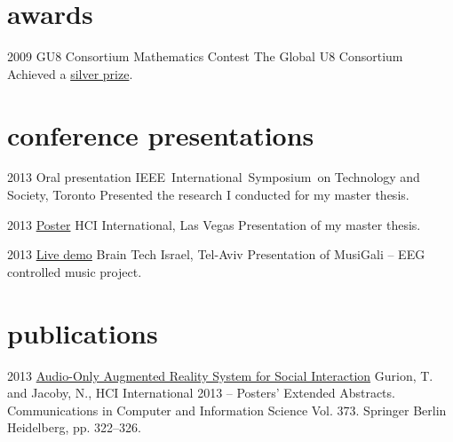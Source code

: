 \documentclass[]{friggeri-cv}  %
\begin{document}
\section{awards}

\begin{entrylist}

    \entry
    {2009}
    {GU8 Consortium Mathematics Contest}
    {The Global U8 Consortium}
    {Achieved a \href{http://db.tt/7b5BuXmT}{silver prize}.}

\end{entrylist}


\section{conference presentations}

\begin{entrylist}

    \entry
    {2013}
    {Oral presentation}
    {IEEE International Symposium on Technology and Society, Toronto}
    {Presented the research I conducted for my master thesis.}

\end{entrylist}
\begin{entrylist}

    \entry
    {2013}
    {\href{https://db.tt/Rx7FnAxn}{Poster}}
    {HCI International, Las Vegas}
    {Presentation of my master thesis.}

\end{entrylist}
\begin{entrylist}

    \entry
    {2013}
    {\href{http://tomgurion.blogspot.co.il/2013/10/musigali-eeg-controlled-music-for-brain.html}{Live demo}}
    {Brain Tech Israel, Tel-Aviv}
    {Presentation of MusiGali -- EEG controlled music project.}

\end{entrylist}


\section{publications}

\begin{entrylist}

    \entry
    {2013}
    {\href{http://db.tt/zpgwMFKJ}{Audio-Only Augmented Reality System for Social Interaction}}
    {}
    {Gurion, T. and Jacoby, N., HCI International 2013 -- Posters’ Extended Abstracts. Communications in Computer and Information Science Vol. 373. Springer Berlin Heidelberg, pp. 322–326.}

\end{entrylist}
\end{document}
